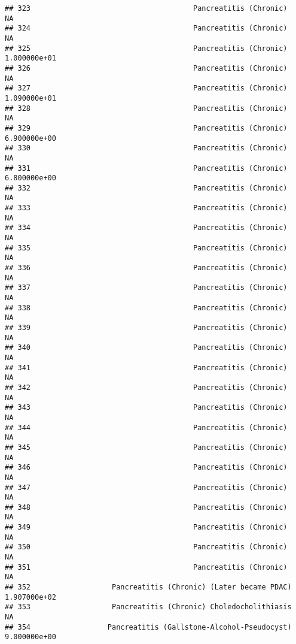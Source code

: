\documentclass[
]{article}
\begin{document}
\begin{verbatim}
## 323                                      Pancreatitis (Chronic)             NA
## 324                                      Pancreatitis (Chronic)             NA
## 325                                      Pancreatitis (Chronic)   1.000000e+01
## 326                                      Pancreatitis (Chronic)             NA
## 327                                      Pancreatitis (Chronic)   1.090000e+01
## 328                                      Pancreatitis (Chronic)             NA
## 329                                      Pancreatitis (Chronic)   6.900000e+00
## 330                                      Pancreatitis (Chronic)             NA
## 331                                      Pancreatitis (Chronic)   6.800000e+00
## 332                                      Pancreatitis (Chronic)             NA
## 333                                      Pancreatitis (Chronic)             NA
## 334                                      Pancreatitis (Chronic)             NA
## 335                                      Pancreatitis (Chronic)             NA
## 336                                      Pancreatitis (Chronic)             NA
## 337                                      Pancreatitis (Chronic)             NA
## 338                                      Pancreatitis (Chronic)             NA
## 339                                      Pancreatitis (Chronic)             NA
## 340                                      Pancreatitis (Chronic)             NA
## 341                                      Pancreatitis (Chronic)             NA
## 342                                      Pancreatitis (Chronic)             NA
## 343                                      Pancreatitis (Chronic)             NA
## 344                                      Pancreatitis (Chronic)             NA
## 345                                      Pancreatitis (Chronic)             NA
## 346                                      Pancreatitis (Chronic)             NA
## 347                                      Pancreatitis (Chronic)             NA
## 348                                      Pancreatitis (Chronic)             NA
## 349                                      Pancreatitis (Chronic)             NA
## 350                                      Pancreatitis (Chronic)             NA
## 351                                      Pancreatitis (Chronic)             NA
## 352                   Pancreatitis (Chronic) (Later became PDAC)  1.907000e+02
## 353                   Pancreatitis (Chronic) Choledocholithiasis            NA
## 354                  Pancreatitis (Gallstone-Alcohol-Pseudocyst)  9.000000e+00

\end{verbatim}
\end{document}

